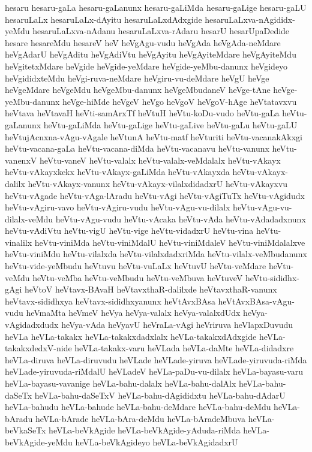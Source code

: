 {hesaru
hesaru-gaLa
hesaru-gaLanunx
hesaru-gaLiMda
hesaru-gaLige
hesaru-gaLU
hesaruLaLx
hesaruLaLx-dAyitu
hesaruLaLxdAdxgide
hesaruLaLxva-nAgididx-yeMdu
hesaruLaLxva-nAdanu
hesaruLaLxva-rAdaru
hesarU
hesarUpaDedide
hesare
hesareMdu
hesareV
heV
heVgAgu-vudu
heVgAda
heVgAda-neMdare
heVgAdarU
heVgAditu
heVgAdiVtu
heVgAyitu
heVgAyiteMdare
heVgAyiteMdu
heVgitetxMdare
heVgide
heVgide-yeMdare
heVgide-yeMbu-danunx
heVgideyo
heVgididxteMdu
heVgi-ruva-neMdare
heVgiru-vu-deMdare
heVgU
heVge
heVgeMdare
heVgeMdu
heVgeMbu-danunx
heVgeMbudaneV
heVge-tAne
heVge-yeMbu-danunx
heVge-hiMde
heVgeV
heVgo
heVgoV
heVgoV-hAge
heVtatavxvu
heVtava
heVtavaH
heVti-samArxTf
heVtuH
heVtu-koDu-vudo
heVtu-gaLa
heVtu-gaLanunx
heVtu-gaLiMda
heVtu-gaLige
heVtu-gaLive
heVtu-gaLu
heVtu-gaLU
heVtujAcnxna-vAgu-vAgale
heVtunA
heVtu-matf
heVturiti
heVtu-vacanakAkxgi
heVtu-vacana-gaLa
heVtu-vacana-diMda
heVtu-vacanavu
heVtu-vanunx
heVtu-vanenxV
heVtu-vaneV
heVtu-valalx
heVtu-valalx-veMdalalx
heVtu-vAkayx
heVtu-vAkayxkekx
heVtu-vAkayx-gaLiMda
heVtu-vAkayxda
heVtu-vAkayx-dalilx
heVtu-vAkayx-vanunx
heVtu-vAkayx-vilalxdidadxrU
heVtu-vAkayxvu
heVtu-vAgade
heVtu-vAga-lAradu
heVtu-vAgi
heVtu-vAgiTuTx
heVtu-vAgidudx
heVtu-vAgiru-vavo
heVtu-vAgiru-vudu
heVtu-vAgu-vu-dilalx
heVtu-vAgu-vu-dilalx-veMdu
heVtu-vAgu-vudu
heVtu-vAcaka
heVtu-vAda
heVtu-vAdadadxnunx
heVtu-vAdiVtu
heVtu-vigU
heVtu-vige
heVtu-vidadxrU
heVtu-vina
heVtu-vinalilx
heVtu-viniMda
heVtu-viniMdalU
heVtu-viniMdaleV
heVtu-viniMdalalxve
heVtu-viniMdu
heVtu-vilalxda
heVtu-vilalxdadxriMda
heVtu-vilalx-veMbudanunx
heVtu-vide-yeMbudu
heVtuvu
heVtu-vuLaLx
heVtuvU
heVtu-veMdare
heVtu-veMdu
heVtu-veMba
heVtu-veMbudu
heVtu-veMbuva
heVtuveV
heVtu-sididhx-gAgi
heVtoV
heVtavx-BAvaH
heVtavxthaR-dalilxde
heVtavxthaR-vanunx
heVtavx-sididhxya
heVtavx-sididhxyanunx
heVtAvxBAsa
heVtAvxBAsa-vAgu-vudu
heVmaMta
heVmeV
heVya
heVya-valalx
heVya-valalxdUdx
heVya-vAgidadxdudx
heVya-vAda
heVyavU
heVraLa-vAgi
heVriruva
heVlapxDuvudu
heVLa
heVLa-takakx
heVLa-takakxdadxlalx
heVLa-takakxdAdxgide
heVLa-takakxdedxV-nide
heVLa-takakx-varu
heVLada
heVLa-daMte
heVLa-didadxre
heVLa-diruva
heVLa-diruvudu
heVLade
heVLade-yiruva
heVLade-yiruvuda-riMda
heVLade-yiruvuda-riMdalU
heVLadeV
heVLa-paDu-vu-dilalx
heVLa-bayasu-varu
heVLa-bayasu-vavanige
heVLa-bahu-dalalx
heVLa-bahu-dalAlx
heVLa-bahu-daSeTx
heVLa-bahu-daSeTxV
heVLa-bahu-dAgididxtu
heVLa-bahu-dAdarU
heVLa-bahudu
heVLa-bahude
heVLa-bahu-deMdare
heVLa-bahu-deMdu
heVLa-bAradu
heVLa-bArade
heVLa-bAra-deMdu
heVLa-bAradeMbuva
heVLa-beVkaSeTx
heVLa-beVkAgide
heVLa-beVkAgide-yAduda-riMda
heVLa-beVkAgide-yeMdu
heVLa-beVkAgideyo
heVLa-beVkAgidadxrU
}
